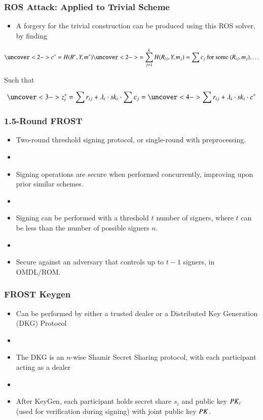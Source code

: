 \documentclass[hyperref={pdfpagelabels=true},table,dvipsnames,14pt,aspectratio=169]{beamer}
\begin{document}
\begin{frame}
  \frametitle{ROS Attack: Applied to Trivial Scheme}

  \begin{itemize}
    \item<1-> A forgery for the trivial construction can be produced using this ROS solver, by finding 
  \end{itemize}
	\[ \uncover<2-> { c^*= H(R^*, Y, m^*) \uncover<2->{ = \sum_{j=1}^{k} H(R_{ij}, Y, m_j)  =
	\sum c_j  \text{ for some } (R_{ij}, m_j), \dots } } \]

	Such that

	\[ \uncover<3-> {z_i^* = \sum r_{ij} + \lambda_i \cdot \sk_i \cdot \sum c_j} = \uncover<4->
	{ \sum r_{ij} + \lambda_i \cdot \sk_i \cdot c^*} \]
\end{frame}

\begin{frame}
  \frametitle{1.5-Round FROST}

  \begin{itemize}
    \item<1-> Two-round threshold signing protocol, or single-round with preprocessing.
    \item[]
    \item<2-> Signing operations are secure when performed concurrently,
      improving upon prior similar schemes.
    \item[]
    \item<3-> Signing can be performed with a threshold $t$ number of signers,
      where $t$ can be less than the number of possible signers $n$.
    \item[]
    \item<4-> Secure against an adversary that controls up to $t-1$ signers, in OMDL/ROM.
  \end{itemize}
\end{frame}

\begin{frame}
  \frametitle{FROST Keygen}

  \begin{itemize}
    \item<1-> Can be performed by either a trusted dealer or a Distributed Key
      Generation (DKG) Protocol
    \item[]
    \item<2-> The DKG is an $n$-wise Shamir Secret Sharing protocol, with each
      participant acting as a dealer
    \item[]
    \item<3> After KeyGen, each participant holds secret share $s_i$ and
      public key $\mathit{PK}_i$ (used for verification during signing) with joint public key $\mathit{PK}$.
  \end{itemize}

\end{frame}
\end{document}
